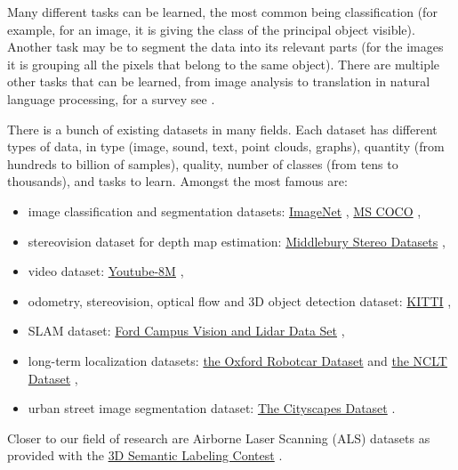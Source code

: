 \documentclass[a4paper, 10pt, journal]{article}
\begin{document}
Many different tasks can be learned, the most common being classification (for example, for an image, it is giving the class of the principal object visible). Another task may be to segment the data into its relevant parts (for the images it is grouping all the pixels that belong to the same object). There are multiple other tasks that can be learned, from image analysis to translation in natural language processing, for a survey see \cite{ferraro2015survey}.


There is a bunch of existing datasets in many fields. Each dataset has different types of data, in type (image, sound, text, point clouds, graphs), quantity (from hundreds to billion of samples), quality, number of classes (from tens to thousands), and tasks to learn. Amongst the most famous are:
\begin{itemize}
 \item image classification and segmentation datasets:  \href{http://www.image-net.org/}{ImageNet} %
  \cite{deng2009imagenet}, \href{http://mscoco.org/}{MS COCO} %
  \cite{lin2014microsoft},
 \item stereovision dataset for depth map estimation: \href{http://vision.middlebury.edu/stereo/data/}{Middlebury Stereo Datasets} %
  \cite{scharstein2014high},
 \item video dataset: \href{https://research.google.com/youtube8m/}{Youtube-8M} %
  \cite{abu2016youtube},
 \item odometry, stereovision, optical flow and 3D object detection dataset: \href{http://www.cvlibs.net/datasets/kitti/index.php}{KITTI} %
  \cite{Geiger2012CVPR},
 \item SLAM dataset: \href{http://robots.engin.umich.edu/SoftwareData/Ford}{Ford Campus Vision and Lidar Data Set} \cite{pandey2011ford},
 \item long-term localization datasets: \href{http://robotcar-dataset.robots.ox.ac.uk/}{the Oxford Robotcar Dataset} \cite{RobotCarDatasetIJRR} and \href{http://robots.engin.umich.edu/nclt/}{the NCLT Dataset} \cite{carlevaris2016university},
 \item urban street image segmentation dataset: \href{https://www.cityscapes-dataset.com/}{The Cityscapes Dataset} \cite{cordts2016cityscapes}.
\end{itemize} 
Closer to our field of research are Airborne Laser Scanning (ALS) datasets as provided with the \href{http://www2.isprs.org/commissions/comm3/wg4/3d-semantic-labeling.html}{3D Semantic Labeling Contest} %
  \cite{niemeyer2014contextual}.
\end{document}

